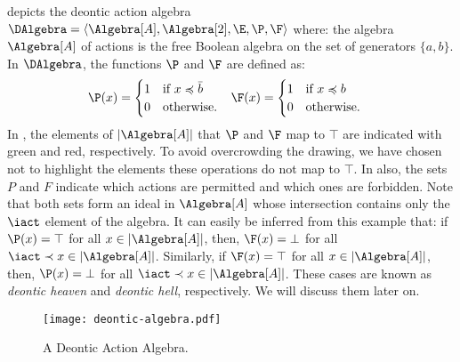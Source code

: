 \medskip
\begin{example}
	 depicts the deontic action algebra ${\DAlgebra = \langle \Algebra[A], \Algebra[2], \E, \P, \F \rangle}$ where: the algebra $\Algebra[A]$ of actions is the free Boolean algebra on the set of generators $\{a,b\}$.
	In $\DAlgebra$, the functions $\P$ and $\F$ are defined as:
	\begin{align*}
		\P(x) &=
			{\begin{cases}
				1 & \text{if } x \preccurlyeq \bar{b} \\
				0 & \text{otherwise.}
			\end{cases}}
		&
		\F(x) &=
			{\begin{cases}
				1 & \text{if } x \preccurlyeq b \\
				0 & \text{otherwise.}
			\end{cases}}
	\label{eq:ex:pf}
	\end{align*}
	In , the elements of $|\Algebra[A]|$ that $\P$ and $\F$ map to $\top$ are indicated with green and red, respectively.
	To avoid overcrowding the drawing, we have chosen not to highlight the elements these operations do not map to $\top$.
	In  also, the sets $P$ and $F$ indicate which actions are permitted and which ones are forbidden.
	Note that both sets form an ideal in $\Algebra[A]$ whose intersection contains only the $\iact$ element of the algebra.
	It can easily be inferred from this example that: if $\P(x) = \top$ for all $x \in |\Algebra[A]|$, then, $\F(x) = \bot$ for all $\iact \prec x \in |\Algebra[A]|$.
	Similarly, if $\F(x) = \top$ for all $x \in |\Algebra[A]|$, then, $\P(x) = \bot$ for all $\iact \prec x \in |\Algebra[A]|$.
	These cases are known as \emph{deontic heaven} and \emph{deontic hell}, respectively.
	We will discuss them later on.
\end{example}
\medskip

\begin{figure}
	\centering
	\texttt{[image: deontic-algebra.pdf]}\\[.5em]
	\caption{A Deontic Action Algebra.}\label{ex:deontic:algebra}
\end{figure}

